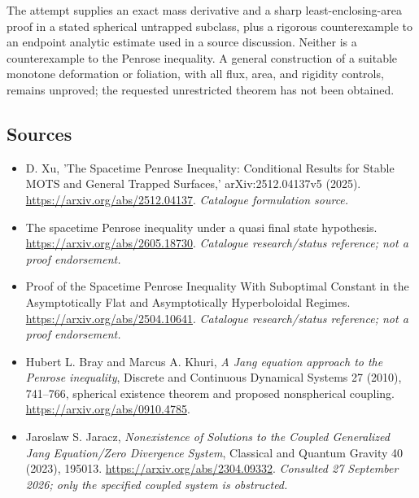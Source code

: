 \documentclass[11pt,a4paper]{article}
\numberwithin{equation}{section}
\begin{document}
The attempt supplies an exact mass derivative and a sharp least-enclosing-area
proof in a stated spherical untrapped subclass, plus a rigorous counterexample
to an endpoint analytic estimate used in a source discussion. Neither is a
counterexample to the Penrose inequality. A general construction of a suitable
monotone deformation or foliation, with all flux, area, and rigidity controls,
remains unproved; the requested unrestricted theorem has not been obtained.


\subsection{Sources}
\begin{itemize}\raggedright
\item[\textnormal{[S1]}]\hypertarget{source:statement:1}{} D. Xu, 'The Spacetime Penrose Inequality: Conditional Results for Stable MOTS and General Trapped Surfaces,' arXiv:2512.04137v5 (2025).
\url{https://arxiv.org/abs/2512.04137}.
{\small\textit{Catalogue formulation source.}}
\item[\textnormal{[S2]}]\hypertarget{source:statement:2}{} The spacetime Penrose inequality under a quasi final state hypothesis.
\url{https://arxiv.org/abs/2605.18730}.
{\small\textit{Catalogue research/status reference; not a proof endorsement.}}
\item[\textnormal{[S3]}]\hypertarget{source:statement:3}{} Proof of the Spacetime Penrose Inequality With Suboptimal Constant in the Asymptotically Flat and Asymptotically Hyperboloidal Regimes.
\url{https://arxiv.org/abs/2504.10641}.
{\small\textit{Catalogue research/status reference; not a proof endorsement.}}
\item[\textnormal{[E1]}]\hypertarget{extra:statement:1}{} Hubert L. Bray and Marcus A. Khuri,
\emph{A Jang equation approach to the Penrose inequality}, Discrete and Continuous
Dynamical Systems 27 (2010), 741--766, spherical existence theorem and proposed nonspherical coupling.
\url{https://arxiv.org/abs/0910.4785}.
\item[\textnormal{[E2]}]\hypertarget{extra:statement:2}{} Jaroslaw S. Jaracz,
\emph{Nonexistence of Solutions to the Coupled Generalized Jang Equation/Zero Divergence System}, Classical and Quantum Gravity 40 (2023), 195013.
\url{https://arxiv.org/abs/2304.09332}.
{\small\textit{Consulted 27 September 2026; only the specified coupled system is obstructed.}}

\end{itemize}

\end{document}
